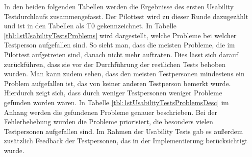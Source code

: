In den beiden folgenden Tabellen werden die Ergebnisse des ersten Usability Testdurchlaufs zusammengefasst. Der Pilottest wird zu dieser Runde dazugezählt und ist in den Tabellen als T0 gekennzeichnet. In Tabelle \ref{tbl:1stUsabilityTestsProblems} wird dargestellt, welche Probleme bei welcher Testperson aufgefallen sind. So sieht man, dass die meisten Probleme, die im Pilottest aufgetreten sind, danach nicht mehr auftraten. Dies lässt sich darauf zurückführen, dass sie vor der Durchführung der restlichen Tests behoben wurden. Man kann zudem sehen, dass den meisten Testpersonen mindestens ein Problem aufgefallen ist, das von keiner anderen Testperson bemerkt wurde. Hierdurch zeigt sich, dass durch weniger Testpersonen weniger Probleme gefunden worden wären. In Tabelle \ref{tbl:1stUsabilityTestsProblemsDesc} im Anhang werden die gefundenen Probleme genauer beschrieben. Bei der Fehlerbehebung wurden die Probleme priorisiert, die besonders vielen Testpersonen aufgefallen sind. Im Rahmen der Usability Tests gab es außerdem zusätzlich Feedback der Testpersonen, das in der Implementierung berücksichtigt wurde.

